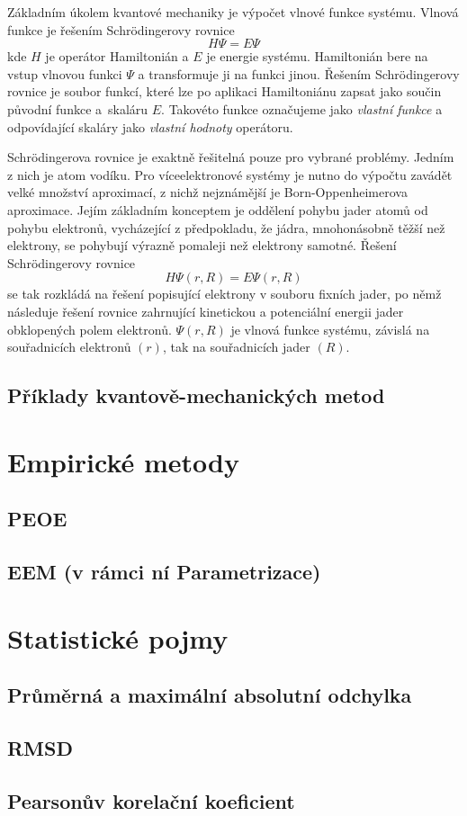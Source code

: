 Základním úkolem kvantové mechaniky je výpočet vlnové funkce systému.
Vlnová funkce je řešením Schrödingerovy rovnice $$ H\Psi = E\Psi$$ kde $H$ je operátor Hamiltonián a $E$
 je energie systému. Hamiltonián bere na vstup vlnovou funkci $\Psi$ a transformuje ji na funkci jinou. Řešením Schrödingerovy rovnice je soubor funkcí, které lze po aplikaci Hamiltoniánu zapsat jako součin původní funkce a~skaláru $E$. Takovéto funkce označujeme jako \textit{vlastní funkce} a odpovídající skaláry jako \textit{vlastní hodnoty} operátoru. 
 
 Schrödingerova rovnice je exaktně řešitelná pouze pro vybrané problémy. Jedním z nich je atom vodíku. Pro víceelektronové systémy je nutno do výpočtu zavádět velké množství aproximací, z nichž nejznámější je Born-Oppenheimerova aproximace. %
 Jejím základním konceptem je oddělení pohybu jader atomů od pohybu elektronů, vycházející z předpokladu, že jádra, mnohonásobně těžší než elektrony,
 se pohybují výrazně pomaleji než elektrony samotné. Řešení Schrödingerovy rovnice $$H\Psi(r, R) = E\Psi(r, R)$$se tak rozkládá na řešení popisující elektrony v souboru fixních jader, po němž následuje řešení rovnice zahrnující kinetickou a potenciální energii jader obklopených polem elektronů. $\Psi(r, R)$ je vlnová funkce systému, závislá na souřadnicích elektronů $(r)$, tak na souřadnicích jader $(R)$.
 

 
\subsection{Příklady kvantově-mechanických metod}
\section{Empirické metody}
\subsection{PEOE}
\subsection{EEM (v rámci ní Parametrizace)}
\section{Statistické pojmy}
\subsection{Průměrná a maximální absolutní odchylka}
\subsection{RMSD}
\subsection{Pearsonův korelační koeficient}



